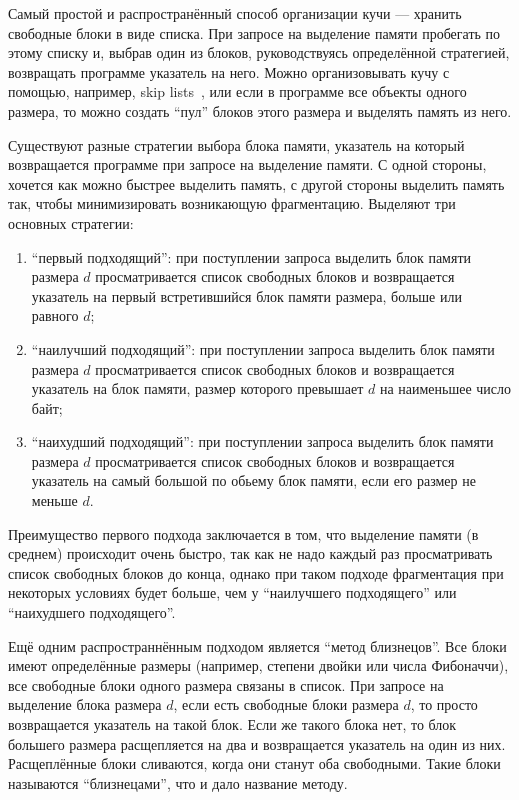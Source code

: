 Самый простой и распространённый способ организации кучи --- хранить свободные блоки в виде списка. При запросе на выделение памяти пробегать по этому списку и, выбрав один из блоков, руководствуясь определённой стратегией, возвращать программе указатель на него. Можно организовывать кучу с помощью, например, skip lists~\cite{skiplists}, или если в программе все объекты одного размера, то можно создать ``пул'' блоков этого размера и выделять память из него.

Существуют разные стратегии выбора блока памяти, указатель на который возвращается программе при запросе на выделение памяти. С одной стороны, хочется как можно быстрее выделить память, с другой стороны выделить память так, чтобы минимизировать возникающую фрагментацию. Выделяют три основных стратегии:
\begin{enumerate}
\item ``первый подходящий'': при поступлении запроса выделить блок памяти размера $d$ просматривается список свободных блоков и возвращается указатель на первый встретившийся блок памяти размера, больше или равного $d$;
\item ``наилучший подходящий'': при поступлении запроса выделить блок памяти размера $d$ просматривается список свободных блоков и возвращается указатель на блок памяти, размер которого превышает $d$ на наименьшее число байт;
\item ``наихудший подходящий'': при поступлении запроса выделить блок памяти размера $d$ просматривается список свободных блоков и возвращается указатель на самый большой по обьему блок памяти, если его размер не меньше $d$.
\end{enumerate}

Преимущество первого подхода заключается в том, что выделение памяти (в среднем)
происходит очень быстро, так как не надо каждый раз просматривать список свободных блоков до конца,
однако при таком подходе фрагментация при некоторых условиях будет больше, чем у 
``наилучшего подходящего'' или ``наихудшего подходящего''.

Ещё одним распространнённым подходом является ``метод близнецов''. Все блоки имеют 
определённые размеры (например, степени двойки или числа Фибоначчи), все свободные блоки
одного размера связаны в список. При запросе на выделение блока размера $d$, если есть свободные
блоки размера $d$, то просто возвращается указатель на такой блок. Если же такого блока нет, 
то блок большего размера расщепляется на два и возвращается указатель на один из них. 
Расщеплённые блоки сливаются, когда они станут оба свободными. Такие блоки называются
``близнецами'', что и дало название методу.

